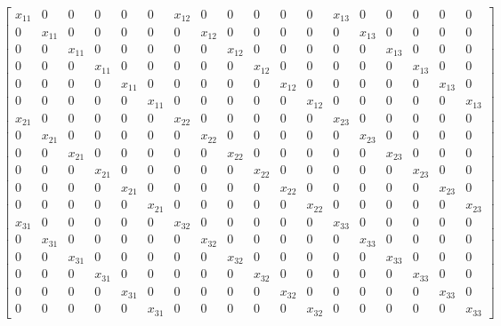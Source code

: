 \begin{equation*}
\left[\begin{array}{cccccccccccccccccc}x_{11} & 0 & 0 & 0 & 0 & 0 & x_{12} & 0 & 0 & 0 & 0 & 0 & x_{13} & 0 & 0 & 0 & 0 & 0\\0 & x_{11} & 0 & 0 & 0 & 0 & 0 & x_{12} & 0 & 0 & 0 & 0 & 0 & x_{13} & 0 & 0 & 0 & 0\\0 & 0 & x_{11} & 0 & 0 & 0 & 0 & 0 & x_{12} & 0 & 0 & 0 & 0 & 0 & x_{13} & 0 & 0 & 0\\0 & 0 & 0 & x_{11} & 0 & 0 & 0 & 0 & 0 & x_{12} & 0 & 0 & 0 & 0 & 0 & x_{13} & 0 & 0\\0 & 0 & 0 & 0 & x_{11} & 0 & 0 & 0 & 0 & 0 & x_{12} & 0 & 0 & 0 & 0 & 0 & x_{13} & 0\\0 & 0 & 0 & 0 & 0 & x_{11} & 0 & 0 & 0 & 0 & 0 & x_{12} & 0 & 0 & 0 & 0 & 0 & x_{13}\\x_{21} & 0 & 0 & 0 & 0 & 0 & x_{22} & 0 & 0 & 0 & 0 & 0 & x_{23} & 0 & 0 & 0 & 0 & 0\\0 & x_{21} & 0 & 0 & 0 & 0 & 0 & x_{22} & 0 & 0 & 0 & 0 & 0 & x_{23} & 0 & 0 & 0 & 0\\0 & 0 & x_{21} & 0 & 0 & 0 & 0 & 0 & x_{22} & 0 & 0 & 0 & 0 & 0 & x_{23} & 0 & 0 & 0\\0 & 0 & 0 & x_{21} & 0 & 0 & 0 & 0 & 0 & x_{22} & 0 & 0 & 0 & 0 & 0 & x_{23} & 0 & 0\\0 & 0 & 0 & 0 & x_{21} & 0 & 0 & 0 & 0 & 0 & x_{22} & 0 & 0 & 0 & 0 & 0 & x_{23} & 0\\0 & 0 & 0 & 0 & 0 & x_{21} & 0 & 0 & 0 & 0 & 0 & x_{22} & 0 & 0 & 0 & 0 & 0 & x_{23}\\x_{31} & 0 & 0 & 0 & 0 & 0 & x_{32} & 0 & 0 & 0 & 0 & 0 & x_{33} & 0 & 0 & 0 & 0 & 0\\0 & x_{31} & 0 & 0 & 0 & 0 & 0 & x_{32} & 0 & 0 & 0 & 0 & 0 & x_{33} & 0 & 0 & 0 & 0\\0 & 0 & x_{31} & 0 & 0 & 0 & 0 & 0 & x_{32} & 0 & 0 & 0 & 0 & 0 & x_{33} & 0 & 0 & 0\\0 & 0 & 0 & x_{31} & 0 & 0 & 0 & 0 & 0 & x_{32} & 0 & 0 & 0 & 0 & 0 & x_{33} & 0 & 0\\0 & 0 & 0 & 0 & x_{31} & 0 & 0 & 0 & 0 & 0 & x_{32} & 0 & 0 & 0 & 0 & 0 & x_{33} & 0\\0 & 0 & 0 & 0 & 0 & x_{31} & 0 & 0 & 0 & 0 & 0 & x_{32} & 0 & 0 & 0 & 0 & 0 & x_{33}\end{array}\right]
\end{equation*}

